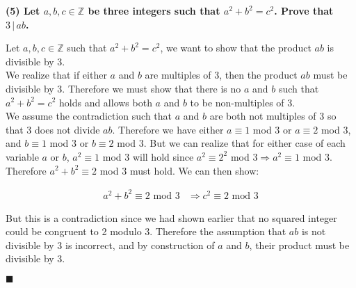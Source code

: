 \documentclass[20pt]{article}
\begin{document}
\noindent
\textbf{(5) Let $a, b, c \in \mathbb{Z}$ be three integers such that $a^2 + b^2 = c^2$. Prove that $3 \,|\, ab$.}\\
\begin{text}
    \noindent
    Let $a, b, c \in \mathbb{Z}$ such that $a^2 + b^2 = c^2$, we want to show that the product $ab$ is divisible by 3.\\
    
    \noindent
    We realize that if either $a$ and $b$ are multiples of 3, then the product $ab$ must be divisible by 3. Therefore we must show that there is no $a$ and $b$ such that $a^2 + b^2 = c^2$ holds and allows both $a$ and $b$ to be non-multiples of 3.\\
    
    \noindent
    We assume the contradiction such that $a$ and $b$ are both not multiples of 3 so that 3 does not divide $ab$. Therefore we have either $a \equiv 1$ mod $3$ or $a \equiv 2$ mod $3$, and $b \equiv 1$ mod $3$ or $b \equiv 2$ mod $3$. But we can realize that for either case of each variable $a$ or $b$, $a^2 \equiv 1$ mod $3$ will hold since $a^2 \equiv 2^2$ mod $3 \Longrightarrow a^2 \equiv 1$ mod $3$. Therefore $a^2 + b^2 \equiv 2$ mod $3$ must hold. We can then show:
    
    \begin{align}
        a^2 + b^2 \equiv 2 \text{ mod } 3 &\Longrightarrow c^2 \equiv 2 \text{ mod } 3\nonumber
    \end{align}
    
    \noindent
    But this is a contradiction since we had shown earlier that no squared integer could be congruent to 2 modulo 3. Therefore the assumption that $ab$ is not divisible by 3 is incorrect, and by construction of $a$ and $b$, their product must be divisible by 3.
    
    \hfill $\blacksquare$
\end{text}\\
\end{document}
